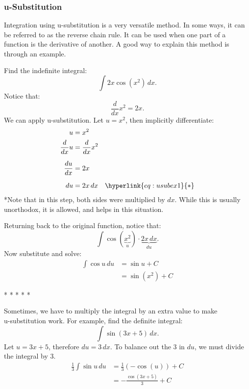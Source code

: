 \documentclass[12pt]{article}
\begin{document}
\subsubsection{u-Substitution}
Integration using u-substitution is a very versatile method. In some ways, it can be referred to as the reverse chain rule. It can be used when one part of a function is the derivative of another. A good way to explain this method is through an example.

\noindent Find the indefinite integral:
\[ \int 2x \cos(x^2) \, dx. \]
\newline
Notice that:
\[ \frac{d}{dx} x^2 = 2x. \]
We can apply u-substitution. Let $u = x^2$, then implicitly differentiate:
\begin{align*}
	u              & = x^2                                      \\
	\frac{d}{dx} u & = \frac{d}{dx} x^2                         \\[6pt]
	\frac{du}{dx}  & = 2x                                       \\[6pt]
	du             & = 2x \, dx \quad \hyperlink{eq:usubex1}{*}
\end{align*}
\hypertarget{eq:usubex1}{*}Note that in this step, both sides were multiplied by $dx$. While this is usually unorthodox, it is allowed, and helps in this situation.
\bigskip

\noindent Returning back to the original function, notice that:
\[ \int \cos(\underbrace{x^2}_{u}) \cdot \underbrace{2x \, dx}_{du}. \]
Now substitute and solve:
\begin{align*}
	\int \cos{u} \, du & = \sin{u} + C   \\
	& = \sin(x^2) + C
\end{align*}
\begin{center}
	* * * * *
\end{center}

Sometimes, we have to multiply the integral by an extra value to make \\u-substitution work. For example, find the definite integral: %
\[ \int \sin(3x+5) \, dx. \]
Let $u = 3x+5$, therefore $du = 3 \, dx$. To balance out the $3$ in $du$, we must divide the integral by $3$.
\begin{align*}
	\frac{1}{3} \int \sin{u} \, du & = \frac{1}{3} \left( -\cos(u) \right) + C \\[6pt]
	& = -\frac{\cos(3x+5)}{3} + C
\end{align*}
\end{document}
